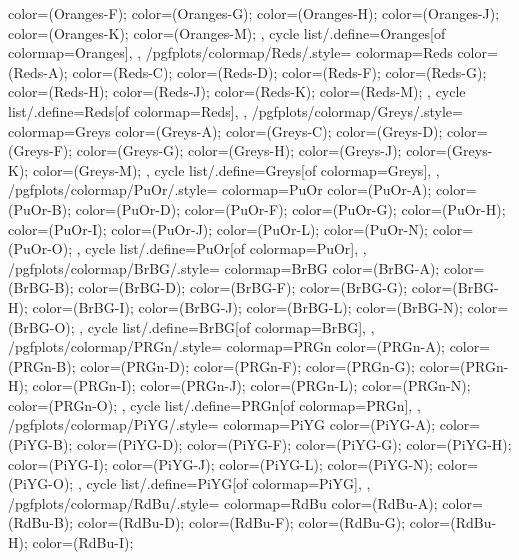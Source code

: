 {{{      color=(Oranges-F);
      color=(Oranges-G);
      color=(Oranges-H);
      color=(Oranges-J);
      color=(Oranges-K);
      color=(Oranges-M);
    },
    cycle list/.define={Oranges}{[of colormap=Oranges]},
  },
  /pgfplots/colormap/Reds/.style={
    colormap={Reds}{
      color=(Reds-A);
      color=(Reds-C);
      color=(Reds-D);
      color=(Reds-F);
      color=(Reds-G);
      color=(Reds-H);
      color=(Reds-J);
      color=(Reds-K);
      color=(Reds-M);
    },
    cycle list/.define={Reds}{[of colormap=Reds]},
  },
  /pgfplots/colormap/Greys/.style={
    colormap={Greys}{
      color=(Greys-A);
      color=(Greys-C);
      color=(Greys-D);
      color=(Greys-F);
      color=(Greys-G);
      color=(Greys-H);
      color=(Greys-J);
      color=(Greys-K);
      color=(Greys-M);
    },
    cycle list/.define={Greys}{[of colormap=Greys]},
  },
  /pgfplots/colormap/PuOr/.style={
    colormap={PuOr}{
      color=(PuOr-A);
      color=(PuOr-B);
      color=(PuOr-D);
      color=(PuOr-F);
      color=(PuOr-G);
      color=(PuOr-H);
      color=(PuOr-I);
      color=(PuOr-J);
      color=(PuOr-L);
      color=(PuOr-N);
      color=(PuOr-O);
    },
    cycle list/.define={PuOr}{[of colormap=PuOr]},
  },
  /pgfplots/colormap/BrBG/.style={
    colormap={BrBG}{
      color=(BrBG-A);
      color=(BrBG-B);
      color=(BrBG-D);
      color=(BrBG-F);
      color=(BrBG-G);
      color=(BrBG-H);
      color=(BrBG-I);
      color=(BrBG-J);
      color=(BrBG-L);
      color=(BrBG-N);
      color=(BrBG-O);
    },
    cycle list/.define={BrBG}{[of colormap=BrBG]},
  },
  /pgfplots/colormap/PRGn/.style={
    colormap={PRGn}{
      color=(PRGn-A);
      color=(PRGn-B);
      color=(PRGn-D);
      color=(PRGn-F);
      color=(PRGn-G);
      color=(PRGn-H);
      color=(PRGn-I);
      color=(PRGn-J);
      color=(PRGn-L);
      color=(PRGn-N);
      color=(PRGn-O);
    },
    cycle list/.define={PRGn}{[of colormap=PRGn]},
  },
  /pgfplots/colormap/PiYG/.style={
    colormap={PiYG}{
      color=(PiYG-A);
      color=(PiYG-B);
      color=(PiYG-D);
      color=(PiYG-F);
      color=(PiYG-G);
      color=(PiYG-H);
      color=(PiYG-I);
      color=(PiYG-J);
      color=(PiYG-L);
      color=(PiYG-N);
      color=(PiYG-O);
    },
    cycle list/.define={PiYG}{[of colormap=PiYG]},
  },
  /pgfplots/colormap/RdBu/.style={
    colormap={RdBu}{
      color=(RdBu-A);
      color=(RdBu-B);
      color=(RdBu-D);
      color=(RdBu-F);
      color=(RdBu-G);
      color=(RdBu-H);
      color=(RdBu-I);
}}}
